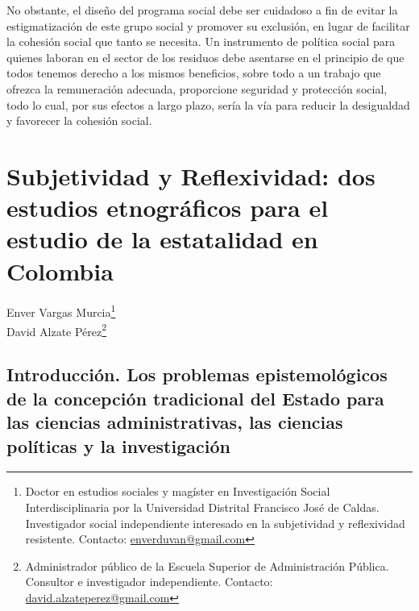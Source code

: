 \documentclass[
  spanish,
  11pt,
  a4paper,
]{scrbook}
\begin{document}
No obstante, el diseño del programa social debe ser cuidadoso a fin de
evitar la estigmatización de este grupo social y promover su exclusión,
en lugar de facilitar la cohesión social que tanto se necesita. Un
instrumento de política social para quienes laboran en el sector de los
residuos debe asentarse en el principio de que todos tenemos derecho a
los mismos beneficios, sobre todo a un trabajo que ofrezca la
remuneración adecuada, proporcione seguridad y protección social, todo
lo cual, por sus efectos a largo plazo, sería la vía para reducir la
desigualdad y favorecer la cohesión social.

\printbibliography[heading=subbibliography, title={Referencias Bibliográficas}]


\chapter{Subjetividad y Reflexividad: dos estudios etnográficos para el
estudio de la estatalidad en
Colombia}\label{subjetividad-y-reflexividad-dos-estudios-etnogruxe1ficos-para-el-estudio-de-la-estatalidad-en-colombia}


\begin{flushright}
\Large Enver Vargas Murcia\footnote{Doctor en estudios sociales y magíster en Investigación Social Interdisciplinaria por la Universidad Distrital Francisco José de Caldas.  Investigador social independiente interesado en la subjetividad y reflexividad resistente. Contacto: \href{enverduvan@gmail.com}{enverduvan@gmail.com}} \\ David Alzate Pérez\footnote{Administrador público de la Escuela Superior de Administración Pública. Consultor e investigador independiente. Contacto: \href{david.alzateperez@gmail.com}{david.alzateperez@gmail.com}}
\end{flushright}

\section*{Introducción. Los problemas epistemológicos de la concepción
tradicional del Estado para las ciencias administrativas, las ciencias
políticas y la
investigación}\label{introducciuxf3n.-los-problemas-epistemoluxf3gicos-de-la-concepciuxf3n-tradicional-del-estado-para-las-ciencias-administrativas-las-ciencias-poluxedticas-y-la-investigaciuxf3n}
\end{document}
